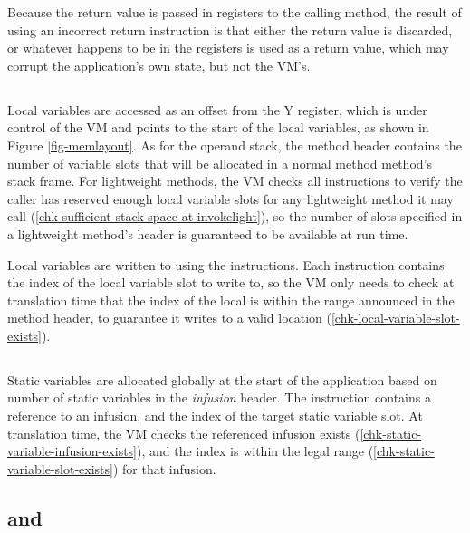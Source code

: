 Because the return value is passed in registers to the calling method, the result of using an incorrect return instruction is that either the return value is discarded, or whatever happens to be in the registers is used as a return value, which may corrupt the application's own state, but not the VM's.

\subsection{}
Local variables are accessed as an offset from the Y register, which is under control of the VM and points to the start of the local variables, as shown in Figure \ref{fig-memlayout}. As for the operand stack, the method header contains the number of variable slots that will be allocated in a normal method method's stack frame. For lightweight methods, the VM checks all  instructions to verify the caller has reserved enough local variable slots for any lightweight method it may call (\ref{chk-sufficient-stack-space-at-invokelight}), so the number of slots specified in a lightweight method's header is guaranteed to be available at run time.

Local variables are written to using the  instructions. Each  instruction contains the index of the local variable slot to write to, so the VM only needs to check at translation time that the index of the local is within the range announced in the method header, to guarantee it writes to a valid location (\ref{chk-local-variable-slot-exists}).

\subsection{}
Static variables are allocated globally at the start of the application based on number of static variables in the \emph{infusion} header. The  instruction contains a reference to an infusion, and the index of the target static variable slot. At translation time, the VM checks the referenced infusion exists (\ref{chk-static-variable-infusion-exists}), and the index is within the legal range (\ref{chk-static-variable-slot-exists}) for that infusion.

\subsection{ and }
\label{sec-safety-heap-access}

